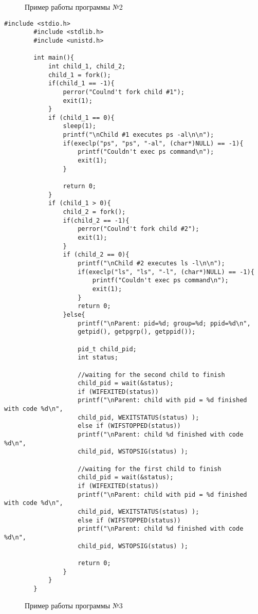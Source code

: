 \documentclass[12pt]{report}
\begin{document}
	\begin{figure}[H]
		\caption{Пример работы программы №2}
		\label{ris:task2}
	\end{figure}
	\newpage
	\begin{lstlisting}[label=three,caption =  Использование вызова exec(), style = CStyle]
		#include <stdio.h>
		#include <stdlib.h>
		#include <unistd.h>
		
		int main(){
			int child_1, child_2;
			child_1 = fork();
			if(child_1 == -1){
				perror("Coulnd't fork child #1");
				exit(1);
			}
			if (child_1 == 0){
				sleep(1);
				printf("\nChild #1 executes ps -al\n\n");
				if(execlp("ps", "ps", "-al", (char*)NULL) == -1){
					printf("Couldn't exec ps command\n");
					exit(1);
				}
				
				return 0;
			}
			if (child_1 > 0){
				child_2 = fork();
				if(child_2 == -1){
					perror("Coulnd't fork child #2");
					exit(1);
				}
				if (child_2 == 0){
					printf("\nChild #2 executes ls -l\n\n");
					if(execlp("ls", "ls", "-l", (char*)NULL) == -1){
						printf("Couldn't exec ps command\n");
						exit(1);
					}
					return 0;
				}else{
					printf("\nParent: pid=%d; group=%d; ppid=%d\n",
					getpid(), getpgrp(), getppid());
					
					pid_t child_pid;
					int status;
					
					//waiting for the second child to finish
					child_pid = wait(&status);
					if (WIFEXITED(status))
					printf("\nParent: child with pid = %d finished with code %d\n",
					child_pid, WEXITSTATUS(status) );
					else if (WIFSTOPPED(status))
					printf("\nParent: child %d finished with code %d\n",
					child_pid, WSTOPSIG(status) );
					
					//waiting for the first child to finish	 
					child_pid = wait(&status);
					if (WIFEXITED(status))
					printf("\nParent: child with pid = %d finished with code %d\n",
					child_pid, WEXITSTATUS(status) );
					else if (WIFSTOPPED(status))
					printf("\nParent: child %d finished with code %d\n",
					child_pid, WSTOPSIG(status) );
					
					return 0;
				}
			}
		}
	\end{lstlisting}
	\begin{figure}[H]
		\caption{Пример работы программы №3}
		\label{ris:task3}
	\end{figure}
	\newpage
\end{document}

